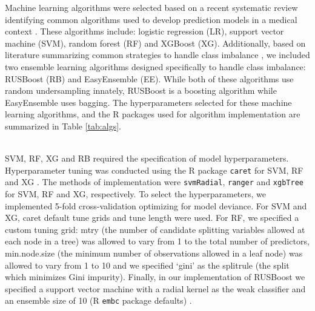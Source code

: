 \documentclass[AMA,STIX1COL,]{WileyNJD-v2}
\begin{document}
\hfill\break
Machine learning algorithms were selected based on a recent systematic
review identifying common algorithms used to develop prediction models
in a medical context \citep{constanza}. These algorithms include:
logistic regression (LR), support vector machine (SVM), random forest
(RF) and XGBoost (XG). Additionally, based on literature summarizing
common strategies to handle class imbalance \citep{summary_m, lp, kaur},
we included two ensemble learning algorithms designed specifically to
handle class imbalance: RUSBoost (RB) and EasyEnsemble (EE). While both
of these algorithms use random undersampling innately, RUSBoost
\citep{rusboost} is a boosting algorithm while EasyEnsemble \citep{ee}
uses bagging. The hyperparameters selected for these machine learning
algorithms, and the R packages used for algorithm implementation are
summarized in Table \ref{tab:algs}.\\
\strut \\
SVM, RF, XG and RB required the specification of model hyperparameters.
Hyperparameter tuning was conducted using the R package \texttt{caret}
for SVM, RF and XG \citep{caret}. The methods of implementation were
\texttt{svmRadial}, \texttt{ranger} and \texttt{xgbTree} for SVM, RF and
XG, respectively. To select the hyperparameters, we implemented 5-fold
cross-validation optimizing for model deviance. For SVM and XG, caret
default tune grids and tune length were used. For RF, we specified a
custom tuning grid: mtry (the number of candidate splitting variables
allowed at each node in a tree) was allowed to vary from 1 to the total
number of predictors, min.node.size (the minimum number of observations
allowed in a leaf node) was allowed to vary from 1 to 10 and we
specified `gini' as the splitrule (the split which minimizes Gini
impurity). Finally, in our implementation of RUSBoost we specified a
support vector machine with a radial kernel as the weak classifier and
an ensemble size of 10 (R \texttt{embc} package defaults)
\citep{ebmc}.\\
\end{document}
